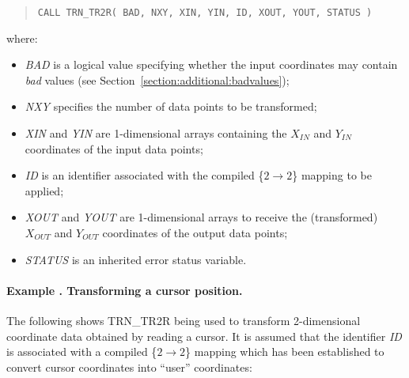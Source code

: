 \documentclass[twoside,11pt]{article}
\newcommand{\name}[1]{\mbox{\small{#1}}}
\newcommand{\fortvar}[1]{\mbox{\emph{#1}}}
\newcounter{examplecounter}
\newcommand{\example}[1]{\addtocounter{examplecounter}{1}
                         \paragraph{\textbf{Example \theexamplecounter. #1}}}
\begin{document}
\begin{quote}
\begin{verbatim}
CALL TRN_TR2R( BAD, NXY, XIN, YIN, ID, XOUT, YOUT, STATUS )
\end{verbatim}
\end{quote}

where:

\begin{itemize}

\item \fortvar{BAD} is a logical value specifying whether the input 
coordinates may contain \emph{bad} values (see 
Section~\ref{section:additional:badvalues});

\item \fortvar{NXY} specifies the number of data points to be transformed;

\item \fortvar{XIN} and \fortvar{YIN} are 1-dimensional arrays containing
the $X_{IN}$ and $Y_{IN}$ coordinates of the input data points;

\item \fortvar{ID} is an identifier associated with the compiled 
\mbox{\{$2 \rightarrow 2$\}} mapping to be applied;

\item \fortvar{XOUT} and \fortvar{YOUT} are 1-dimensional arrays to receive
the (transformed) $X_{OUT}$ and $Y_{OUT}$ coordinates of the output data
points; 

\item \fortvar{STATUS} is an inherited error status variable.

\end{itemize}

\example{Transforming a cursor position.}
The following shows \name{TRN\_TR2R} being used to transform 2-dimensional
coordinate data obtained by reading a cursor. 
It is assumed that the identifier \fortvar{ID} is associated with a compiled
\mbox{\{$2 \rightarrow 2$\}} mapping which has been established to convert
cursor coordinates into ``user'' coordinates: 
\end{document}
